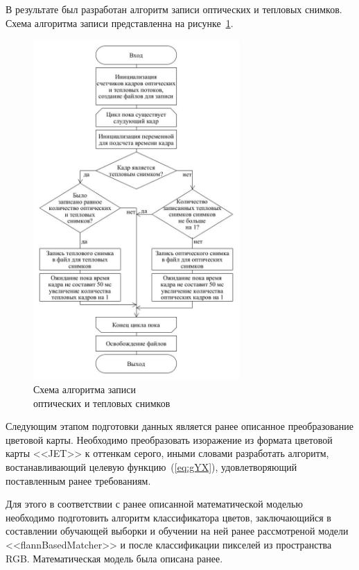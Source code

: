 \documentclass[14pt, a4paper]{extreport}
\begin{document}
	В результате был разработан алгоритм записи оптических и тепловых снимков. Схема алгоритма записи представленна на рисунке~\ref{fig:loaddata}.
	
	\begin{figure}[h!]
		\centering
		\includegraphics[width = 0.7\textwidth]{image/chapter_2/loaddata}	
		\caption{Схема алгоритма записи\\ оптических и тепловых снимков}
		\label{fig:loaddata}
	\end{figure}
	
	Следующим этапом подготовки данных является ранее описанное преобразование цветовой карты. Необходимо преобразовать изоражение из формата цветовой карты <<JET>> к оттенкам серого, иными словами разработать алгоритм, востанавливающий целевую функцию~(\ref{eq:gYX}), удовлетворяющий поставленным ранее требованиям.
	
	Для этого в соответствии с ранее описанной математической моделью необходимо подготовить алгоритм классификатора цветов, заключающийся в составлении обучающей выборки и обучении на ней ранее рассмотреной модели <<flannBasedMatcher>> и после классификации пикселей из пространства RGB. Математическая модель была описана ранее.  
	
\end{document}

